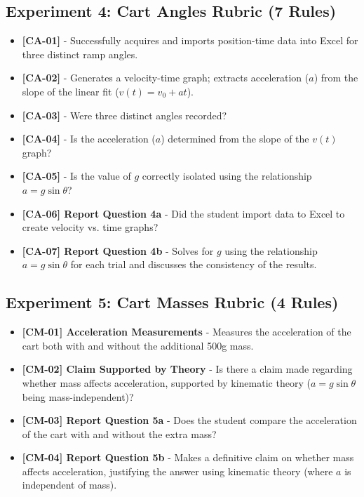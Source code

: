 \documentclass{article}
\begin{document}
\subsection*{Experiment 4: Cart Angles Rubric (7 Rules)}
\begin{itemize}
\item \textbf{ [CA-01] } - Successfully acquires and imports position-time data into Excel for three distinct ramp angles.
\item \textbf{ [CA-02] } - Generates a velocity-time graph; extracts acceleration ($a$) from the slope of the linear fit ($v(t) = v_0 + at$).
\item \textbf{ [CA-03] } - Were three distinct angles recorded?
\item \textbf{ [CA-04] } - Is the acceleration ($a$) determined from the slope of the $v(t)$ graph?
\item \textbf{ [CA-05] } - Is the value of $g$ correctly isolated using the relationship $a = g \sin\theta$?    
\item \textbf{ [CA-06] Report Question 4a } - Did the student import data to Excel to create velocity vs. time graphs?
\item \textbf{ [CA-07] Report Question 4b } - Solves for $g$ using the relationship $a = g \sin \theta$ for each trial and discusses the consistency of the results.
\end{itemize}

\subsection*{Experiment 5: Cart Masses Rubric (4 Rules)}
\begin{itemize}
\item \textbf{ [CM-01] Acceleration Measurements } - Measures the acceleration of the cart both with and without the additional 500g mass.
\item \textbf{ [CM-02] Claim Supported by Theory } - Is there a claim made regarding whether mass affects acceleration, supported by kinematic theory ($a = g \sin\theta$ being mass-independent)?    
\item \textbf{ [CM-03] Report Question 5a } - Does the student compare the acceleration of the cart with and without the extra mass?
\item \textbf{ [CM-04] Report Question 5b } - Makes a definitive claim on whether mass affects acceleration, justifying the answer using kinematic theory (where $a$ is independent of mass).
\end{itemize}
\end{document}
